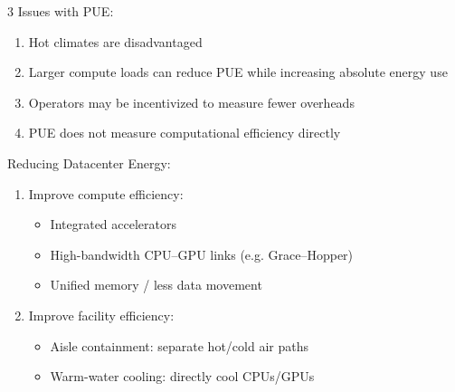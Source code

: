 \documentclass[12pt, a4paper]{article}
\begin{document}
\begin{multicols*}{3}
Issues with PUE:
\begin{enumerate}[\roman*.]
  \item Hot climates are disadvantaged
  \item Larger compute loads can reduce PUE while increasing absolute energy use
  \item Operators may be incentivized to measure fewer overheads
  \item PUE does not measure computational efficiency directly
\end{enumerate}

Reducing Datacenter Energy:
\begin{enumerate}[\roman*.]
  \item Improve compute efficiency:
    \begin{itemize}[leftmargin=*]\vspace{2pt}
      \item Integrated accelerators
      \item High-bandwidth CPU--GPU links (e.g. Grace--Hopper)
      \item Unified memory / less data movement
    \end{itemize}
  \item Improve facility efficiency:
    \begin{itemize}[leftmargin=*]\vspace{2pt}
      \item Aisle containment: separate hot/cold air paths
      \item Warm-water cooling: directly cool CPUs/GPUs
    \end{itemize}
\end{enumerate}
\colbreak 

\end{multicols*}
\end{document}
